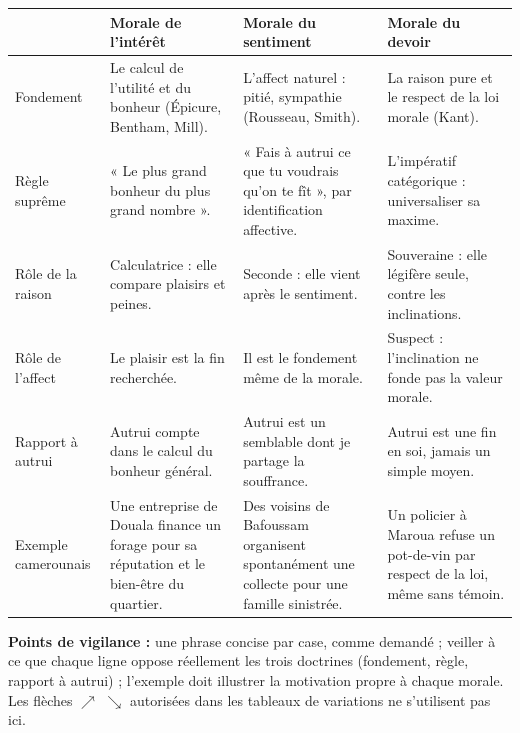 \documentclass[11pt]{article}
\begin{document}
\begin{corrige}
\begin{center}
\begin{tabularx}{\linewidth}{|l|X|X|X|}
\hline
\rowcolor{popblueL} & \textbf{Morale de l'intérêt} & \textbf{Morale du sentiment} & \textbf{Morale du devoir} \\
\hline
Fondement & Le calcul de l'utilité et du bonheur (Épicure, Bentham, Mill). & L'affect naturel : pitié, sympathie (Rousseau, Smith). & La raison pure et le respect de la loi morale (Kant). \\
\hline
Règle suprême & « Le plus grand bonheur du plus grand nombre ». & « Fais à autrui ce que tu voudrais qu'on te fît », par identification affective. & L'impératif catégorique : universaliser sa maxime. \\
\hline
Rôle de la raison & Calculatrice : elle compare plaisirs et peines. & Seconde : elle vient après le sentiment. & Souveraine : elle légifère seule, contre les inclinations. \\
\hline
Rôle de l'affect & Le plaisir est la fin recherchée. & Il est le fondement même de la morale. & Suspect : l'inclination ne fonde pas la valeur morale. \\
\hline
Rapport à autrui & Autrui compte dans le calcul du bonheur général. & Autrui est un semblable dont je partage la souffrance. & Autrui est une fin en soi, jamais un simple moyen. \\
\hline
Exemple camerounais & Une entreprise de Douala finance un forage pour sa réputation et le bien-être du quartier. & Des voisins de Bafoussam organisent spontanément une collecte pour une famille sinistrée. & Un policier à Maroua refuse un pot-de-vin par respect de la loi, même sans témoin. \\
\hline
\end{tabularx}
\end{center}
\textbf{Points de vigilance :} une phrase concise par case, comme demandé ; veiller à ce que chaque ligne oppose réellement les trois doctrines (fondement, règle, rapport à autrui) ; l'exemple doit illustrer la motivation propre à chaque morale. Les flèches $\nearrow$ $\searrow$ autorisées dans les tableaux de variations ne s'utilisent pas ici.
\end{corrige}
\end{document}
